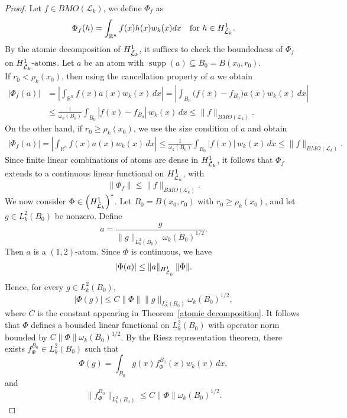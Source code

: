 \documentclass[11pt, reqno]{amsproc}
\theoremstyle{definition}
\theoremstyle{remark}
\numberwithin{equation}{section}
\begin{document}
\begin{proof}
Let $f \in BMO(\mathcal{L}_k)$, we define $\Phi_f$ as 
\begin{align*}
    \Phi_f(h) = \int_{\mathbb{R}^n} f(x)h(x)w_k(x)dx \quad \text{for } h\in H_{\Tilde{\mathcal{L}}_k}^1.
\end{align*}
By the atomic decomposition of $H_{\Tilde{\mathcal{L}}_k}^1$, it suffices to check the boundedness of  $\Phi_f$ on $H_{\Tilde{\mathcal{L}}_k}^{1} \text{-atoms}$. Let $a$ be an atom with $\operatorname{supp}(a)\subseteq B_0=B(x_0,r_0)$. \\

\noindent  If $r_0 < \rho_k(x_0)$, then using the cancellation property of $a$ we obtain
\begin{align*}
|\Phi_f(a)|
&= \left| \int_{\mathbb{R}^n} f(x)a(x)w_k(x)\,dx \right|
 = \left| \int_{B_0}\big(f(x)-f_{B_0}\big)a(x)w_k(x)\,dx \right| \\
&\le \frac{1}{\omega_k(B_0)} \int_{B_0} |f(x)-f_{B_0}|\, w_k(x)\,dx
\le \|f\|_{BMO(\mathcal{L}_k)} .
\end{align*}
On the other hand, if $r_0 \geq \rho_k(x_0)$, we use the size condition of $a$ and obtain
\begin{align*}
|\Phi_f(a)|
= \left| \int_{\mathbb{R}^n} f(x)a(x)w_k(x)\,dx \right|
\le \frac{1}{\omega_k(B_0)} \int_{B_0} |f(x)|\, w_k(x)\,dx
\le \|f\|_{BMO(\mathcal{L}_k)} .
\end{align*}
Since finite linear combinations of atoms are dense in $H_{\Tilde{\mathcal{L}}_k}^1$, it follows that $\Phi_f$ extends to a continuous linear functional on $H_{\Tilde{\mathcal{L}}_k}^1$, with
\[
\|\Phi_f\| \leq \|f\|_{BMO(\mathcal{L}_k)}.
\]
We now consider $\Phi \in \left(H_{\Tilde{\mathcal{L}}_k}^1\right)^*$. Let $B_0 = B(x_0,r_0)$ with $r_0 \ge \rho_k(x_0)$, and let $g \in L_k^2(B_0)$ be nonzero. Define
\[
a = \frac{g}{\|g\|_{L_k^2(B_0)}\, \omega_k(B_0)^{1/2}} .
\]
Then $a$ is a $(1,2)$-atom. Since $\Phi$ is continuous, we have
\[
|\Phi(a)| \le \|a\|_{H_{\Tilde{\mathcal{L}}_k}^1}\,\|\Phi\|.
\]
Hence, for every $g \in L_k^2(B_0)$,
\[
|\Phi(g)| \le C \|\Phi\| \|g\|_{L_k^2(B_0)} \omega_k(B_0)^{1/2},
\]
where $C$ is the constant appearing in Theorem~\ref{atomic decomposition}. It follows that $\Phi$ defines a bounded linear functional on $L_k^2(B_0)$ with operator norm bounded by $C\|\Phi\|\omega_k(B_0)^{1/2}$. By the Riesz representation theorem, there exists $f_\Phi^{B_0} \in L_k^2(B_0)$ such that
\[
\Phi(g) = \int_{B_0} g(x) f_\Phi^{B_0}(x) w_k(x)\,dx,
\]
and
\[
\|f_\Phi^{B_0}\|_{L_k^2(B_0)} \le C \|\Phi\| \omega_k(B_0)^{1/2}.
\]
\end{proof}
\end{document}
